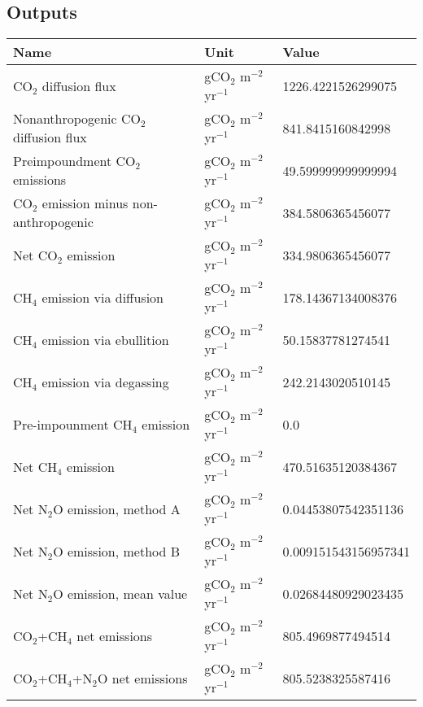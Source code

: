 \documentclass{article}%
\begin{document}
%
\subsection{Outputs}%
\label{subsec:Outputs}%
\begin{center}%
\renewcommand{\arraystretch}{1.0}%
\begin{tabu}{@{}p{10cm} X[c] X[l]@{}}%
\toprule%
\textbf{Name}&\textbf{Unit}&\textbf{Value}\\%
\midrule%
CO$_2$ diffusion flux&gCO$_2$ m$^{-2}$ yr$^{-1}$&\num[round-precision=4,round-mode=figures]{1226.4221526299075}\\%
Nonanthropogenic CO$_2$ diffusion flux&gCO$_2$ m$^{-2}$ yr$^{-1}$&\num[round-precision=4,round-mode=figures]{841.8415160842998}\\%
Preimpoundment CO$_2$ emissions&gCO$_2$ m$^{-2}$ yr$^{-1}$&\num[round-precision=4,round-mode=figures]{49.599999999999994}\\%
CO$_2$ emission minus non-anthropogenic&gCO$_2$ m$^{-2}$ yr$^{-1}$&\num[round-precision=4,round-mode=figures]{384.5806365456077}\\%
Net CO$_2$ emission&gCO$_2$ m$^{-2}$ yr$^{-1}$&\num[round-precision=4,round-mode=figures]{334.9806365456077}\\%
CH$_4$ emission via diffusion&gCO$_2$ m$^{-2}$ yr$^{-1}$&\num[round-precision=4,round-mode=figures]{178.14367134008376}\\%
CH$_4$ emission via ebullition&gCO$_2$ m$^{-2}$ yr$^{-1}$&\num[round-precision=4,round-mode=figures]{50.15837781274541}\\%
CH$_4$ emission via degassing&gCO$_2$ m$^{-2}$ yr$^{-1}$&\num[round-precision=4,round-mode=figures]{242.2143020510145}\\%
Pre-impounment CH$_4$ emission&gCO$_2$ m$^{-2}$ yr$^{-1}$&\num[round-precision=4,round-mode=figures]{0.0}\\%
Net CH$_4$ emission&gCO$_2$ m$^{-2}$ yr$^{-1}$&\num[round-precision=4,round-mode=figures]{470.51635120384367}\\%
Net N$_2$O emission, method A&gCO$_2$ m$^{-2}$ yr$^{-1}$&\num[round-precision=4,round-mode=figures]{0.04453807542351136}\\%
Net N$_2$O emission, method B&gCO$_2$ m$^{-2}$ yr$^{-1}$&\num[round-precision=4,round-mode=figures]{0.009151543156957341}\\%
Net N$_2$O emission, mean value&gCO$_2$ m$^{-2}$ yr$^{-1}$&\num[round-precision=4,round-mode=figures]{0.02684480929023435}\\%
\midrule%
CO$_2$+CH$_4$ net emissions&gCO$_2$ m$^{-2}$ yr$^{-1}$&\num[round-precision=4,round-mode=figures]{805.4969877494514}\\%
\midrule%
CO$_2$+CH$_4$+N$_2$O net emissions&gCO$_2$ m$^{-2}$ yr$^{-1}$&\num[round-precision=4,round-mode=figures]{805.5238325587416}\\\bottomrule%
%
\end{tabu}%
\end{center}%
\end{document}
